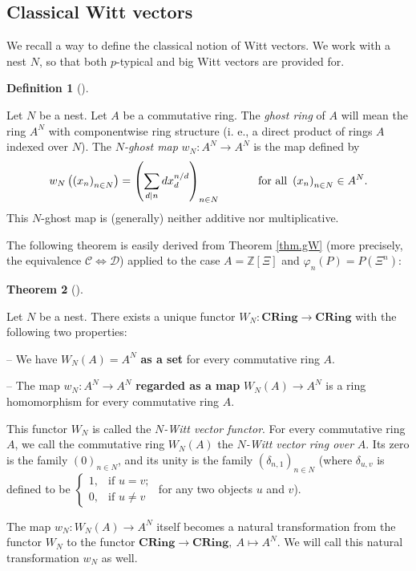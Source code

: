 \documentclass[numbers=enddot,12pt,final,onecolumn,notitlepage]{scrartcl}%
\theoremstyle{definition}
\newtheorem{theo}{Theorem}[section]
\newenvironment{theorem}[1][]
{\begin{theo}[#1]\begin{leftbar}}
{\end{leftbar}\end{theo}}
\newtheorem{defi}[theo]{Definition}
\newenvironment{definition}[1][]
{\begin{defi}[#1]\begin{leftbar}}
{\end{leftbar}\end{defi}}
\let\sumnonlimits\sum
\renewcommand{\sum}{\sumnonlimits\limits}
\begin{document}
\subsection{Classical Witt vectors}

We recall a way to define the classical notion of Witt vectors. We work with a
nest $N$, so that both $p$-typical and big Witt vectors are provided for.

\begin{definition}
\label{def.Witt.ghostmap}Let $N$ be a nest. Let $A$ be a commutative ring. The
\textit{ghost ring} of $A$ will mean the ring $A^{N}$ with componentwise ring
structure (i. e., a direct product of rings $A$ indexed over $N$). The
$N$\textit{-ghost map} $w_{N}:A^{N}\rightarrow A^{N}$ is the map defined by%
\[
w_{N}\left(  \left(  x_{n}\right)  _{n\in N}\right)  =\left(  \sum
\limits_{d\mid n}dx_{d}^{n / d}\right)  _{n\in N}\ \ \ \ \ \ \ \ \ \ \text{for
all }\left(  x_{n}\right)  _{n\in N}\in A^{N}.
\]
This $N$-ghost map is (generally) neither additive nor multiplicative.
\end{definition}

The following theorem is easily derived from Theorem \ref{thm.gW} (more
precisely, the equivalence $\mathcal{C}\Longleftrightarrow\mathcal{D}$)
applied to the case $A=\mathbb{Z}\left[  \Xi\right]  $ and $\varphi_{n}\left(
P\right)  =P\left(  \Xi^{n}\right)  $:

\begin{theorem}
\label{thm.Witt.class}Let $N$ be a nest. There exists a unique functor
$W_{N}:\mathbf{CRing}\rightarrow\mathbf{CRing}$ with the following two properties:

-- We have $W_{N}\left(  A\right)  =A^{N}$ \textbf{as a set} for every
commutative ring $A$.

-- The map $w_{N}:A^{N}\rightarrow A^{N}$ \textbf{regarded as a map }%
$W_{N}\left(  A\right)  \rightarrow A^{N}$ is a ring homomorphism for every
commutative ring $A$.

This functor $W_{N}$ is called the $N$\textit{-Witt vector functor}. For every
commutative ring $A$, we call the commutative ring $W_{N}\left(  A\right)  $
the $N$\textit{-Witt vector ring over }$A$. Its zero is the family $\left(
0\right)  _{n\in N}$, and its unity is the family $\left(  \delta
_{n,1}\right)  _{n\in N}$ (where $\delta_{u,v}$ is defined to be $%
\begin{cases}
1, & \text{if }u=v;\\
0, & \text{if }u\neq v
\end{cases}
$ for any two objects $u$ and $v$).

The map $w_{N}:W_{N}\left(  A\right)  \rightarrow A^{N}$ itself becomes a
natural transformation from the functor $W_{N}$ to the functor $\mathbf{CRing}%
\rightarrow\mathbf{CRing},\ A\mapsto A^{N}$. We will call this natural
transformation $w_{N}$ as well.
\end{theorem}
\end{document}
